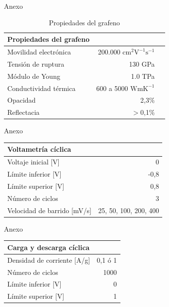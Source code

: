 \documentclass[aspectratio=169]{beamer}
\begin{document}
	\begin{frame}{Anexo}
		\begin{table}[h!]
			\centering
			\begin{tabular}{ l r r }
				Propiedades del grafeno & & \\
				\hline
				Movilidad electrónica & 200.000 $\mathrm{cm^2 V^{-1} s^{-1} }$ & \citep{Bolotin2008}\\
				Tensión de ruptura & 130 GPa & \citep{Lee2008}\\
				Módulo de Young & 1.0 TPa & \citep{Lee2008}\\
				Conductividad térmica & 600 a 5000 $\mathrm{W mK^{-1}}$ & \citep{Balandin2011}\\
				Opacidad & 2,3\% &\citep{Nair2008}\\
				Reflectacia & $>$0,1\% & \citep{Nair2008}\\
			\end{tabular}
			\caption{Propiedades del grafeno}
		\end{table}
	\end{frame}

	\begin{frame}{Anexo}
		\begin{table}[h!]
			\begin{tabular}{ l r }
				Voltametría cíclica &  \\
				\hline
				Voltaje inicial [V] & 0 \\
				Límite inferior [V] & -0,8 \\
				Límite superior [V] & 0,8  \\
				Número de ciclos & 3 \\
				Velocidad de barrido [mV/s] & 25, 50, 100, 200, 400 \\
			\end{tabular}
		\end{table}
	\end{frame}
	\begin{frame}{Anexo}
		\begin{table}[h!]
			\begin{tabular}{ l r }
				Carga y descarga cíclica & \\
				\hline
				Densidad de corriente [A/g] & 0,1 ó 	1 \\
				Número de ciclos & 1000 \\
				Límite inferior [V] & 0 \\
				Límite superior [V] & 1 \\
			\end{tabular}
		\end{table}
	\end{frame}
\end{document}
